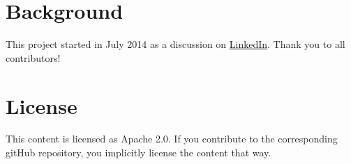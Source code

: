 \section{Background}

This project started in July 2014 as a discussion on \href{https://www.linkedin.com/groupItem?commentID=-1&item=5890782095432781827&type=member&gid=128312&view=}{LinkedIn}.  Thank you to all contributors!

\section{License}
\label{sec:tutorial-license}

This content is licensed as Apache 2.0.  If you contribute to the corresponding gitHub repository, you implicitly license the content that way.


